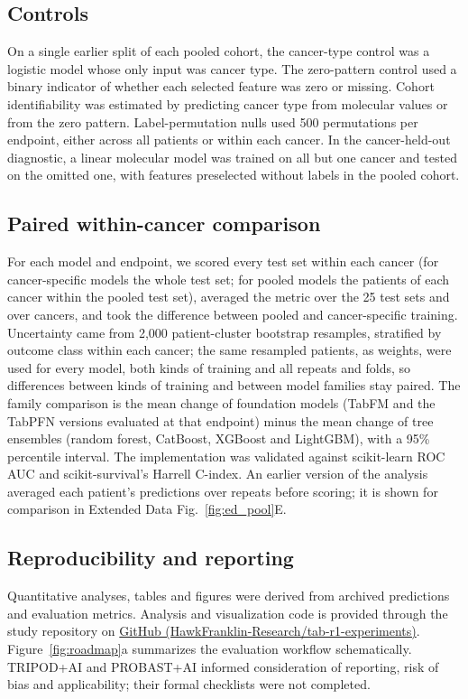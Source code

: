 \documentclass[pdflatex,sn-nature]{sn-jnl}
\begin{document}
\subsection*{Controls}
On a single earlier split of each pooled cohort, the cancer-type control was a logistic model whose only input was cancer type. The zero-pattern control used a binary indicator of whether each selected feature was zero or missing. Cohort identifiability was estimated by predicting cancer type from molecular values or from the zero pattern. Label-permutation nulls used 500 permutations per endpoint, either across all patients or within each cancer. In the cancer-held-out diagnostic, a linear molecular model was trained on all but one cancer and tested on the omitted one, with features preselected without labels in the pooled cohort.

\subsection*{Paired within-cancer comparison}
For each model and endpoint, we scored every test set within each cancer (for cancer-specific models the whole test set; for pooled models the patients of each cancer within the pooled test set), averaged the metric over the 25 test sets and over cancers, and took the difference between pooled and cancer-specific training. Uncertainty came from 2,000 patient-cluster bootstrap resamples, stratified by outcome class within each cancer; the same resampled patients, as weights, were used for every model, both kinds of training and all repeats and folds, so differences between kinds of training and between model families stay paired. The family comparison is the mean change of foundation models (TabFM and the TabPFN versions evaluated at that endpoint) minus the mean change of tree ensembles (random forest, CatBoost, XGBoost and LightGBM), with a 95\% percentile interval. The implementation was validated against scikit-learn ROC AUC and scikit-survival's Harrell C-index. An earlier version of the analysis averaged each patient's predictions over repeats before scoring; it is shown for comparison in Extended Data Fig.~\ref{fig:ed_pool}E.

\subsection*{Reproducibility and reporting}
Quantitative analyses, tables and figures were derived from archived predictions and evaluation metrics. Analysis and visualization code is provided through the study repository on \href{https://github.com/HawkFranklin-Research/tab-r1-experiments}{GitHub (HawkFranklin-Research/tab-r1-experiments)}. Figure~\ref{fig:roadmap}a summarizes the evaluation workflow schematically. TRIPOD+AI and PROBAST+AI informed consideration of reporting, risk of bias and applicability; their formal checklists were not completed.\citep{tripodai2024,probastai2024}
\end{document}
